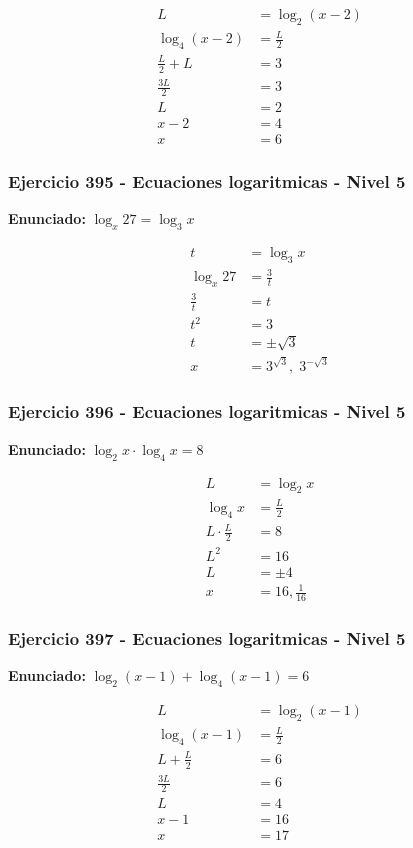 \documentclass[12pt,a4paper]{article}
\begin{document}
\[
\begin{aligned}
L&=\log_2(x-2)\\
\log_4(x-2)&=\frac L2\\
\frac L2+L&=3\\
\frac{3L}{2}&=3\\
L&=2\\
x-2&=4\\
x&=\boxed{6}
\end{aligned}
\]


\subsubsection*{Ejercicio 395 - Ecuaciones logaritmicas - Nivel 5}
\textbf{Enunciado:} \(\log_x27=\log_3x\)

\[
\begin{aligned}
t&=\log_3x\\
\log_x27&=\frac{3}{t}\\
\frac3t&=t\\
t^2&=3\\
t&=\pm\sqrt3\\
x&=\boxed{3^{\sqrt3},\;3^{-\sqrt3}}
\end{aligned}
\]


\subsubsection*{Ejercicio 396 - Ecuaciones logaritmicas - Nivel 5}
\textbf{Enunciado:} \(\log_2x\cdot\log_4x=8\)

\[
\begin{aligned}
L&=\log_2x\\
\log_4x&=\frac L2\\
L\cdot\frac L2&=8\\
L^2&=16\\
L&=\pm4\\
x&=\boxed{16,\frac1{16}}
\end{aligned}
\]


\subsubsection*{Ejercicio 397 - Ecuaciones logaritmicas - Nivel 5}
\textbf{Enunciado:} \(\log_2(x-1)+\log_4(x-1)=6\)

\[
\begin{aligned}
L&=\log_2(x-1)\\
\log_4(x-1)&=\frac L2\\
L+\frac L2&=6\\
\frac{3L}{2}&=6\\
L&=4\\
x-1&=16\\
x&=\boxed{17}
\end{aligned}
\]
\end{document}
